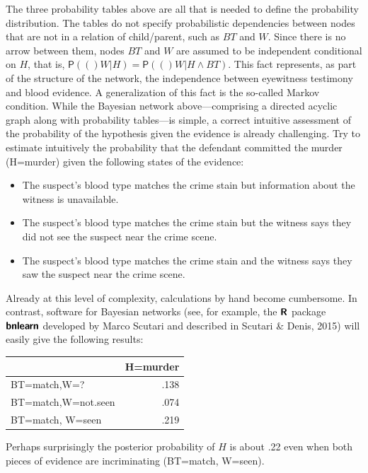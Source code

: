 \documentclass[11pt,dvipsnames,enabledeprecatedfontcommands]{scrartcl}
\newcommand{\pr}[1]{\mathsf{P}(#1)}
\begin{document}
The three probability tables above are all that is needed to define the
probability distribution. The tables do not specify probabilistic
dependencies between nodes that are not in a relation of child/parent,
such as \(BT\) and \(W\). Since there is no arrow between them, nodes
\(BT\) and \(W\) are assumed to be independent conditional on \(H\),
that is, \(\pr(W \vert H)=\pr(W \vert H \wedge BT)\). This fact
represents, as part of the structure of the network, the independence
between eyewitness testimony and blood evidence. A generalization of
this fact is the so-called Markov condition. While the Bayesian network
above---comprising a directed acyclic graph along with probability
tables---is simple, a correct intuitive assessment of the probability of
the hypothesis given the evidence is already challenging. Try to
estimate intuitively the probability that the defendant committed the
murder (H=murder) given the following states of the evidence:

\begin{itemize} 
\item The suspect's blood type matches the crime stain but  information about the witness is unavailable.
\item The suspect's blood type matches the crime stain but the witness says they did not see the suspect near the crime scene.
\item The suspect's blood type matches the crime stain and the witness says they saw the suspect near the crime scene.
\end{itemize}

\noindent Already at this level of complexity, calculations by hand
become cumbersome. In contrast, software for Bayesian networks (see, for
example, the \(\textbf{\textsf{R}}\) package
\(\textbf{\textsf{bnlearn}}\) developed by Marco Scutari and described
in Scutari \& Denis, 2015) will easily give the following results:

\begin{table}[H]
\centering
\begin{tabular}{lr}
\toprule
  & H=murder\\
\midrule
BT=match,W=? & .138\\
BT=match,W=not.seen & .074\\
BT=match, W=seen & .219\\
\bottomrule
\end{tabular}
\end{table}

\noindent Perhaps surprisingly the posterior probability of \(H\) is
about .22 even when both pieces of evidence are incriminating (BT=match,
W=seen).
\end{document}
